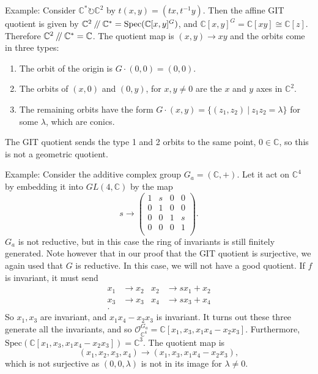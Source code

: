 \documentclass{article}
\theoremstyle{definition}
\newcommand{\C}{\mathbb{C}}
\newcommand{\OO}{\mathcal{O}}
\newcommand{\sslash}{\mathbin{/\mkern-4mu/}}
\newcommand{\Spec}{\text{Spec}}
\begin{document}
Example: Consider $\C^\ast \circlearrowright \C^2$ by $t(x,y)=(tx, t^{-1}y)$. Then the affine GIT quotient is given by $\C^2\sslash \C^\ast = \Spec(\C[x,y]^G)$, and $\C[x,y]^G = \C[xy]\cong \C[z]$. Therefore $\C^2\sslash \C^\ast = \C$. The quotient map is $(x,y)\to xy$ and the orbits come in three types:
\begin{enumerate}
	\item The orbit of the origin is $G\cdot(0,0)=(0,0)$.
	\item The orbits of $(x,0)$ and $(0,y)$, for $x,y\neq 0$ are the $x$ and $y$ axes in $\C^2$.
	\item The remaining orbits have the form $G\cdot(x,y) = \{(z_1,z_2) ~|~ z_1z_2 = \lambda\}$ for some $\lambda$, which are conics.
\end{enumerate}
The GIT quotient sends the type 1 and 2 orbits to the same point, $0\in \C$, so this is not a geometric quotient. \vspace{1em}

Example: Consider the additive complex group $G_a = (\C,+)$. Let it act on $\C^4$ by embedding it into $GL(4,\C)$ by the map
\begin{equation}
	s \to \begin{pmatrix}
		1 & s & 0 & 0\\
		0 & 1 & 0 & 0\\
		0 & 0 & 1 & s\\
		0 & 0 & 0 & 1\\
	\end{pmatrix}.
\end{equation}
$G_a$ is not reductive, but in this case the ring of invariants is still finitely generated. Note however that in our proof that the GIT quotient is surjective, we again used that $G$ is reductive. In this case, we will not have a good quotient. If $f$ is invariant, it must send
\begin{align*}
	x_1 &\to x_2 & x_2 &\to sx_1 + x_2\\
	x_3 &\to x_3 & x_4 &\to sx_3 + x_4\\.
\end{align*}
So $x_1,x_3$ are invariant, and $x_1x_4-x_2x_3$ is invariant. It turns out these three generate all the invariants, and so $\OO_{\C^4}^{G_a} = \C[x_1,x_3,x_1x_4-x_2x_3]$. Furthermore, $\Spec(\C[x_1,x_3,x_1x_4-x_2x_3]) = \C^3$. The quotient map is 
\begin{equation}
	(x_1,x_2,x_3,x_4) \to (x_1,x_3,x_1x_4-x_2x_3),
\end{equation}
which is not surjective as $(0,0,\lambda)$ is not in its image for $\lambda\neq 0$.
\end{document}

